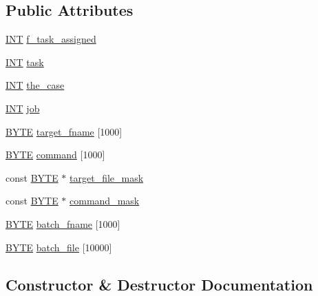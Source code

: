 \subsection*{Public Attributes}
\begin{DoxyCompactItemize}
\item 
\mbox{\hyperlink{galois_8h_a09fddde158a3a20bd2dcadb609de11dc}{I\+NT}} \mbox{\hyperlink{classjob__table_a1422cb3122ed5a141044cd7a36a89a28}{f\+\_\+task\+\_\+assigned}}
\item 
\mbox{\hyperlink{galois_8h_a09fddde158a3a20bd2dcadb609de11dc}{I\+NT}} \mbox{\hyperlink{classjob__table_a5daa9a332184ba87fac5dde897c9c2cb}{task}}
\item 
\mbox{\hyperlink{galois_8h_a09fddde158a3a20bd2dcadb609de11dc}{I\+NT}} \mbox{\hyperlink{classjob__table_a873491706959209c24402d33a10012e9}{the\+\_\+case}}
\item 
\mbox{\hyperlink{galois_8h_a09fddde158a3a20bd2dcadb609de11dc}{I\+NT}} \mbox{\hyperlink{classjob__table_a3ba969cb4bb08f5255aaa4c0d9a1743f}{job}}
\item 
\mbox{\hyperlink{galois_8h_ab6cc7b4aeb6ea31aba2b3fbfc83ff5e6}{B\+Y\+TE}} \mbox{\hyperlink{classjob__table_aafbc3b10b38b4a8a6879bb44a715755e}{target\+\_\+fname}} \mbox{[}1000\mbox{]}
\item 
\mbox{\hyperlink{galois_8h_ab6cc7b4aeb6ea31aba2b3fbfc83ff5e6}{B\+Y\+TE}} \mbox{\hyperlink{classjob__table_aaba9a73e11e682baf229d3cd8d0e46ca}{command}} \mbox{[}1000\mbox{]}
\item 
const \mbox{\hyperlink{galois_8h_ab6cc7b4aeb6ea31aba2b3fbfc83ff5e6}{B\+Y\+TE}} $\ast$ \mbox{\hyperlink{classjob__table_a4f9543aaa023eb321acc2f9aa9c16e86}{target\+\_\+file\+\_\+mask}}
\item 
const \mbox{\hyperlink{galois_8h_ab6cc7b4aeb6ea31aba2b3fbfc83ff5e6}{B\+Y\+TE}} $\ast$ \mbox{\hyperlink{classjob__table_a5e7955474e0dd19ec11fed9e10d0a8d5}{command\+\_\+mask}}
\item 
\mbox{\hyperlink{galois_8h_ab6cc7b4aeb6ea31aba2b3fbfc83ff5e6}{B\+Y\+TE}} \mbox{\hyperlink{classjob__table_ae76e0ce0d07159cf8b3b69cd41ca6b6b}{batch\+\_\+fname}} \mbox{[}1000\mbox{]}
\item 
\mbox{\hyperlink{galois_8h_ab6cc7b4aeb6ea31aba2b3fbfc83ff5e6}{B\+Y\+TE}} \mbox{\hyperlink{classjob__table_ac42aba51a07a55ef59158c64741190e4}{batch\+\_\+file}} \mbox{[}10000\mbox{]}
\end{DoxyCompactItemize}


\subsection{Constructor \& Destructor Documentation}
\mbox{\label{classjob__table_a8204dcc37ee96ff7f1525b52ac5949ef}} 
